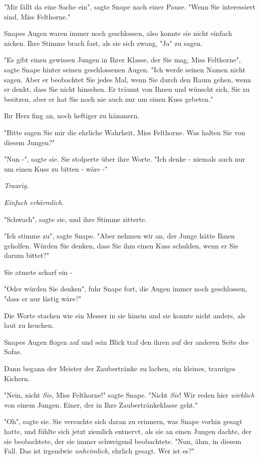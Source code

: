 {"Mir fällt da eine Sache ein", sagte Snape nach einer Pause. "Wenn Sie interessiert sind, Miss Felthorne."

Snapes Augen waren immer noch geschlossen, also konnte sie nicht einfach nicken. Ihre Stimme brach fast, als sie sich zwang, "Ja" zu sagen.

"Es gibt einen gewissen Jungen in Ihrer Klasse, der Sie mag, Miss Felthorne", sagte Snape hinter seinen geschlossenen Augen. "Ich werde seinen Namen nicht sagen. Aber er beobachtet Sie jedes Mal, wenn Sie durch den Raum gehen, wenn er denkt, dass Sie nicht hinsehen. Er träumt von Ihnen und wünscht sich, Sie zu besitzen, aber er hat Sie noch nie auch nur um einen Kuss gebeten."

Ihr Herz fing an, noch heftiger zu hämmern.

"Bitte sagen Sie mir die ehrliche Wahrheit, Miss Felthorne. Was halten Sie von diesem Jungen?"

"Nun -", sagte sie. Sie stolperte über ihre Worte. "Ich denke - niemals auch nur um einen Kuss zu bitten - wäre -"

\emph{\emph{Traurig.}}

\emph{\emph{Einfach erbärmlich.}}

"Schwach", sagte sie, und ihre Stimme zitterte.

"Ich stimme zu", sagte Snape. "Aber nehmen wir an, der Junge hätte Ihnen geholfen. Würden Sie denken, dass Sie ihm einen Kuss schulden, wenn er Sie darum bittet?"

Sie atmete scharf ein -

"Oder würden Sie denken", fuhr Snape fort, die Augen immer noch geschlossen, "dass er nur lästig wäre?"

Die Worte stachen wie ein Messer in sie hinein und sie konnte nicht anders, als laut zu keuchen.

Snapes Augen flogen auf und sein Blick traf den ihren auf der anderen Seite des Sofas.

Dann begann der Meister der Zaubertränke zu lachen, ein kleines, trauriges Kichern.

"Nein, nicht \emph{Sie}, Miss Felthorne!" sagte Snape. "Nicht \emph{Sie}! Wir reden hier \emph{wirklich} von einem Jungen. Einer, der in Ihre Zaubertränkeklasse geht."

"Oh", sagte sie. Sie versuchte sich daran zu erinnern, was Snape vorhin gesagt hatte, und fühlte sich jetzt ziemlich entnervt, als sie an einen Jungen dachte, der sie beobachtete, der sie immer schweigend beobachtete. "Nun, ähm, in diesem Fall. Das ist irgendwie \emph{unheimlich}, ehrlich gesagt. Wer ist es?"

}
